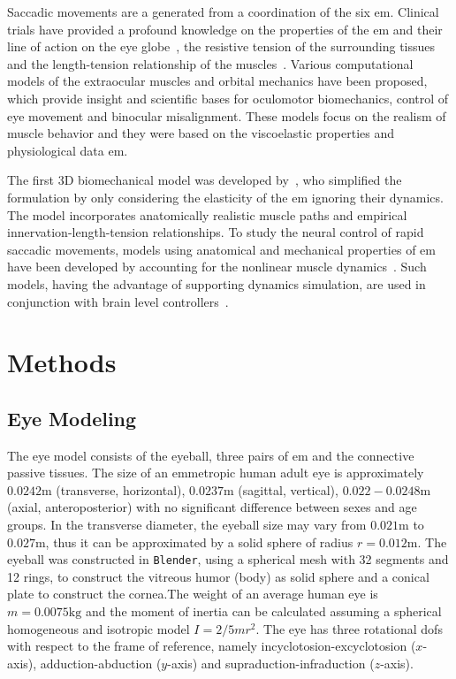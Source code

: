 \documentclass[11pt,a4paper,draft=false]{report}
\begin{document}
Saccadic movements are a generated from a coordination of the six
\gls{em}. Clinical trials have provided a profound knowledge on the properties
of the \gls{em} and their line of action on the eye globe~\cite{Robinson1969a},
the resistive tension of the surrounding tissues~\cite{Collins1981} and the
length-tension relationship of the muscles~\cite{Iskander2018}. Various
computational models of the extraocular muscles and orbital mechanics have been
proposed, which provide insight and scientific bases for oculomotor
biomechanics, control of eye movement and binocular misalignment. These models
focus on the realism of muscle behavior and they were based on the viscoelastic
properties and physiological data \gls{em}.

The first 3D biomechanical model was developed by~\cite{Robinson1964a,
  Robinson1969}, who simplified the formulation by only considering the
elasticity of the \gls{em} ignoring their dynamics. The model incorporates
anatomically realistic muscle paths and empirical innervation-length-tension
relationships. To study the neural control of rapid saccadic movements, models
using anatomical and mechanical properties of \gls{em} have been developed by
accounting for the nonlinear muscle dynamics~\cite{Thelen2003a,
  Millard2013}. Such models, having the advantage of supporting dynamics
simulation, are used in conjunction with brain level
controllers~\cite{James2018}.

\section*{Methods}\label{sec:methods}

\subsection*{Eye Modeling}\label{sec:eye-Modeling}

The eye model consists of the eyeball, three pairs of \gls{em} and the
connective passive tissues. The size of an emmetropic human adult eye is
approximately $0.0242 \si{\m}$ (transverse, horizontal), $0.0237 \si{\m}$
(sagittal, vertical), $0.022 - 0.0248 \si{\m}$ (axial, anteroposterior) with no
significant difference between sexes and age groups. In the transverse diameter,
the eyeball size may vary from $0.021 \si{\m}$ to $0.027 \si{\m}$, thus it can
be approximated by a solid sphere of radius $r = 0.012 \si{\m}$. The eyeball was
constructed in \texttt{Blender}, using a spherical mesh with 32 segments and 12
rings, to construct the vitreous humor (body) as solid sphere and a conical
plate to construct the cornea.The weight of an average human eye is
$m = 0.0075 \si{\kg}$ and the moment of inertia can be calculated assuming a
spherical homogeneous and isotropic model $I = 2 / 5 m r^2$. The eye has three
rotational \gls{dofs} with respect to the frame of reference, namely
incyclotosion-excyclotosion ($x$-axis), adduction-abduction ($y$-axis) and
supraduction-infraduction ($z$-axis).
\end{document}
